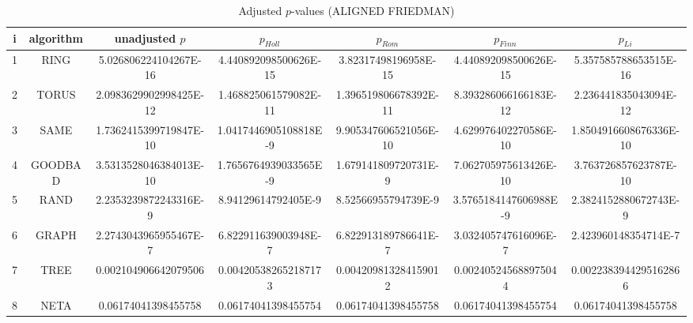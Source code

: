 \documentclass[a4paper,10pt]{article}
\begin{document}
\begin{landscape}
\begin{table}[!htp]
\centering\scriptsize
\caption{Adjusted $p$-values (ALIGNED FRIEDMAN)}
\begin{tabular}{ccccccc}
i&algorithm&unadjusted $p$&$p_{Holl}$&$p_{Rom}$&$p_{Finn}$&$p_{Li}$\\
\hline
1& RING&5.026806224104267E-16&4.440892098500626E-15&3.82317498196958E-15&4.440892098500626E-15&5.357585788653515E-16\\
2& TORUS&2.0983629902998425E-12&1.468825061579082E-11&1.396519806678392E-11&8.393286066166183E-12&2.236441835043094E-12\\
3& SAME&1.7362415399719847E-10&1.0417446905108818E-9&9.905347606521056E-10&4.629976402270586E-10&1.8504916608676336E-10\\
4& GOODBAD&3.5313528046384013E-10&1.7656764939033565E-9&1.679141809720731E-9&7.062705975613426E-10&3.763726857623787E-10\\
5& RAND&2.2353239872243316E-9&8.94129614792405E-9&8.52566955794739E-9&3.5765184147606988E-9&2.3824152880672743E-9\\
6& GRAPH&2.2743043965955467E-7&6.822911639003948E-7&6.822913189786641E-7&3.032405747616096E-7&2.423960148354714E-7\\
7& TREE&0.002104906642079506&0.004205382652187173&0.004209813284159012&0.002405245688975044&0.0022383944295162866\\
8& NETA&0.06174041398455758&0.06174041398455754&0.06174041398455758&0.06174041398455754&0.06174041398455758\\
\hline
\end{tabular}
\end{table}


\newpage


\end{landscape}
\end{document}
